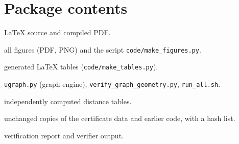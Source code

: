 \section{Package contents}
\begin{description}[leftmargin=1.6em,itemsep=1pt]
\item[\texttt{manuscript/}] LaTeX source and compiled PDF.
\item[\texttt{figures/}] all figures (PDF, PNG) and the script \texttt{code/make\_figures.py}.
\item[\texttt{tables/}] generated LaTeX tables (\texttt{code/make\_tables.py}).
\item[\texttt{code/}] \texttt{ugraph.py} (graph engine), \texttt{verify\_graph\_geometry.py}, \texttt{run\_all.sh}.
\item[\texttt{data/}] independently computed distance tables.
\item[\texttt{inherited/}] unchanged copies of the certificate data and earlier code, with a hash list.
\item[\texttt{reports/}] verification report and verifier output.
\end{description}

